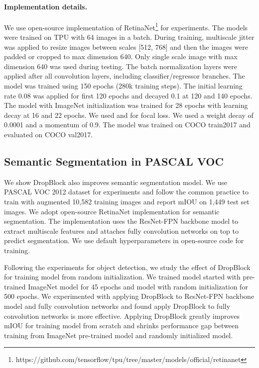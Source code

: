 \documentclass{article}
\begin{document}
\paragraph{Implementation details.}
We use open-source implementation of RetinaNet\footnote{https://github.com/tensorflow/tpu/tree/master/models/official/retinanet} for experiments. The models were trained on TPU with 64 images in a batch. During training, multiscale jitter was applied to resize images between scales [512, 768] and then the images were padded or cropped to max dimension 640. Only single scale image with max dimension 640 was used during testing. The batch normalization layers were applied after all convolution layers, including classifier/regressor branches. The model was trained using 150 epochs (280k training steps). The initial learning rate 0.08 was applied for first 120 epochs and decayed 0.1 at 120 and 140 epochs. The model with ImageNet initialization was trained for 28 epochs with learning decay at 16 and 22 epochs. We used  and  for focal loss. We used a weight decay of 0.0001 and a momentum of 0.9. The model was trained on COCO train2017 and evaluated on COCO val2017.



\subsection{Semantic Segmentation in PASCAL VOC}
We show DropBlock also improves semantic segmentation model. We use PASCAL VOC 2012 dataset for experiments and follow the common practice to train with augmented 10,582 training images \cite{vocdataset2012} and report mIOU on 1,449 test set images. We adopt open-source RetinaNet implementation for semantic segmentation. The implementation uses the ResNet-FPN backbone model to extract multiscale features and attaches fully convolution networks on top to predict segmentation. We use default hyperparameters in open-source code for training.

Following the experiments for object detection, we study the effect of DropBlock for training model from random initialization. We trained model started with pre-trained ImageNet model for 45 epochs and model with random initialization for 500 epochs. We experimented with applying DropBlock to ResNet-FPN backbone model and fully convolution networks and found apply DropBlock to fully convolution networks is more effective. Applying DropBlock greatly improves mIOU for training model from scratch and shrinks performance gap between training from ImageNet pre-trained model and randomly initialized model.
\end{document}
